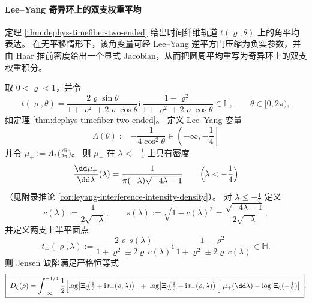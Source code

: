 \paragraph{Lee--Yang 奇异环上的双支权重平均}
定理 \ref{thm:dephys-timefiber-two-ended} 给出时间纤维轨道 \(t(\varrho,\theta)\) 上的角平均表达。
在无平移情形下，该角变量可经 Lee--Yang 逆平方门压缩为负实参数，并由 Haar 推前密度给出一个显式 Jacobian，从而把圆周平均重写为奇异环上的双支权重积分。

\begin{theorem}\label{thm:xi-timefiber-leyang-two-branch-jensen-average}
取 \(0<\varrho<1\)，并令
\[
t(\varrho,\theta)
=\frac{2\varrho\sin\theta}{1+\varrho^2+2\varrho\cos\theta}
\mathrm{i}\,\frac{1-\varrho^2}{1+\varrho^2+2\varrho\cos\theta}
\in\mathbb H,
\qquad \theta\in[0,2\pi),
\]
如定理 \ref{thm:dephys-timefiber-two-ended}。
定义 Lee--Yang 变量
\[
\Lambda(\theta):=-\frac{1}{4\cos^2\theta}\in\left(-\infty,-\frac14\right]
\]
并令 \(\mu_{+}:=\Lambda_{\ast}\bigl(\frac{\dd\theta}{2\pi}\bigr)\)。
则 \(\mu_{+}\) 在 \(\lambda<-\tfrac14\) 上具有密度
\[
\frac{\dd\mu_{+}}{\dd\lambda}(\lambda)=\frac{1}{\pi(-\lambda)\sqrt{-4\lambda-1}}
\qquad\Bigl(\lambda<-\frac14\Bigr)
\]
（见附录推论 \ref{cor:leyang-interference-intensity-density}）。
对 \(\lambda\le -\tfrac14\) 定义
\[
c(\lambda):=\frac{1}{2\sqrt{-\lambda}},\qquad
s(\lambda):=\sqrt{1-c(\lambda)^2}
=\frac{\sqrt{-4\lambda-1}}{2\sqrt{-\lambda}},
\]
并定义两支上半平面点
\[
t_{\pm}(\varrho,\lambda)
:=\frac{2\varrho\,s(\lambda)}{1+\varrho^2\pm 2\varrho\,c(\lambda)}
\mathrm{i}\,\frac{1-\varrho^2}{1+\varrho^2\pm 2\varrho\,c(\lambda)}\in\mathbb H.
\]
则 Jensen 缺陷满足严格恒等式
\begin{equation}\label{eq:xi-timefiber-leyang-two-branch-jensen-average}
\boxed{\;
D_{\zeta}(\varrho)
=
\int_{-\infty}^{-1/4}
\frac12\Bigl[
\log\bigl|\Xi_{\zeta}\!\bigl(\tfrac12+\mathrm{i}\,t_{+}(\varrho,\lambda)\bigr)\bigr|
\;+\;
\log\bigl|\Xi_{\zeta}\!\bigl(\tfrac12+\mathrm{i}\,t_{-}(\varrho,\lambda)\bigr)\bigr|
\Bigr]\,\mu_{+}(\dd\lambda)
-\log\bigl|\Xi_{\zeta}(-\tfrac12)\bigr|\; }.
\end{equation}
\end{theorem}
